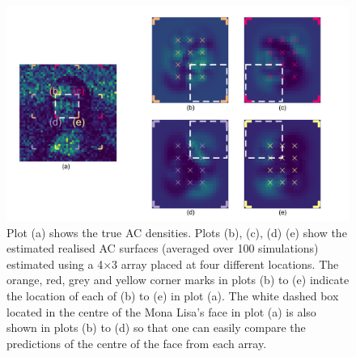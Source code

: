 \documentclass[10pt,a4paper]{article}
\begin{document}
\begin{figure}[htbp]
\centering
\includegraphics[width=1\textwidth]{mona_torch_higheffort.png}
\caption{Plot (a) shows the true AC densities. Plots (b), (c), (d) (e) show the estimated realised AC surfaces (averaged over 100 simulations) estimated using a 4$\times$3 array placed at four different locations. The orange, red, grey and yellow corner marks in plots (b) to (e) indicate the location of each of (b) to (e) in plot (a). The white dashed box located in the centre of the Mona Lisa's face in plot (a) is also shown in plots (b) to (d) so that one can easily compare the predictions of the centre of the face from each array.}
\label{mona_torch_higheffort}
\end{figure}


\end{document}
